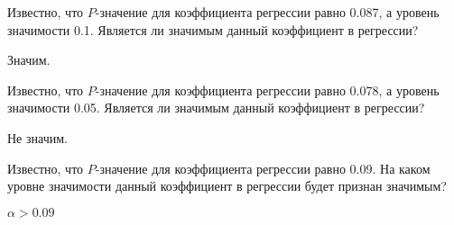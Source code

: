\begin{problem} %
Известно, что $P$-значение для коэффициента регрессии равно 0.087, а уровень значимости 0.1. Является ли значимым данный коэффициент в регрессии?


\begin{sol}
Значим.
\end{sol}
\end{problem}



\begin{problem} %
Известно, что $P$-значение для коэффициента регрессии равно 0.078, а уровень значимости 0.05. Является ли значимым данный коэффициент в регрессии?


\begin{sol}
Не значим.
\end{sol}
\end{problem}



\begin{problem} %
Известно, что $P$-значение для коэффициента регрессии равно 0.09. На каком
уровне значимости данный коэффициент в регрессии будет признан значимым?


\begin{sol}
$\alpha>0.09$
\end{sol}
\end{problem}



